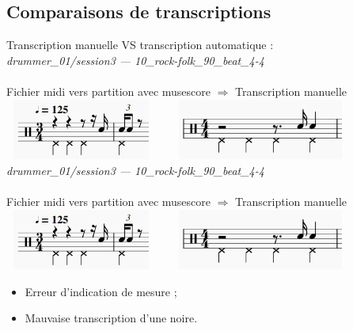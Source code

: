 \subsection*{Comparaisons de transcriptions}
Transcription manuelle VS transcription automatique :\\
\textit{drummer\_01/session3 — 10\_rock-folk\_90\_beat\_4-4}\\\\
Fichier midi vers partition avec musescore $\Rightarrow$ Transcription manuelle\\
\includegraphics[height=20mm, width=50mm]{z_images/transcriptions_manuelles/0_prise_en_main/0_tests_drummer_01__session3/musescore_0.png}\ \ \ \ 
\includegraphics[height=20mm, width=55mm]{z_images/transcriptions_manuelles/0_prise_en_main/0_tests_drummer_01__session3/manuel_0.png}
\textit{drummer\_01/session3 — 10\_rock-folk\_90\_beat\_4-4}\\\\
Fichier midi vers partition avec musescore $\Rightarrow$ Transcription manuelle\\
\includegraphics[height=20mm, width=50mm]{z_images/transcriptions_manuelles/0_prise_en_main/0_tests_drummer_01__session3/musescore_0.png}\ \ \ \ 
\includegraphics[height=20mm, width=55mm]{z_images/transcriptions_manuelles/0_prise_en_main/0_tests_drummer_01__session3/manuel_0.png}
\begin{itemize}
	\item Erreur d’indication de mesure ;
	\item Mauvaise transcription d’une noire.\\
\end{itemize}
